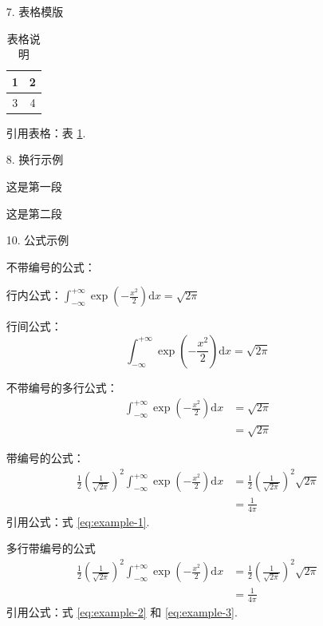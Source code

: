 \documentclass{ctexart}
\renewcommand{\d}{\mathrm{d}}
\begin{document}
\begin{enumerate}[wide, labelindent=0pt]
\item[7.] 表格模版
\begin{table}[H]
    \centering
    \begin{tabular}{|c|c|}
        \hline
        1 & 2 \\
        \hline
        3 & 4 \\
        \hline
    \end{tabular}
    \caption{表格说明}\label{tab:example}
\end{table}
引用表格：表 \ref{tab:example}. 

\item[8.] 换行示例

这是第一段

这是第二段

\item[10.] 公式示例

不带编号的公式：

行内公式：$\int_{-\infty}^{+\infty} \exp\left( -\frac{x^2}{2} \right) \d x = \sqrt{2\pi}$

行间公式：
\[
    \int_{-\infty}^{+\infty} \exp\left( -\frac{x^2}{2} \right) \d x = \sqrt{2\pi}
\]

不带编号的多行公式：
\begin{align*}
    \int_{-\infty}^{+\infty} \exp\left( -\frac{x^2}{2} \right) \d x
    &= \sqrt{2\pi} \\
    &= \sqrt{2\pi}
\end{align*}

带编号的公式：
\begin{equation}
    \begin{aligned}
        \frac{1}{2} \left( \frac{1}{\sqrt{2\pi}} \right)^2 \int_{-\infty}^{+\infty} \exp\left( -\frac{x^2}{2} \right) \d x
        &= \frac{1}{2} \left( \frac{1}{\sqrt{2\pi}} \right)^2 \sqrt{2\pi} \\
        &= \frac{1}{4\pi}
    \end{aligned}\label{eq:example-1}
\end{equation}
引用公式：式 \eqref{eq:example-1}. 

多行带编号的公式
\begin{align}
    \frac{1}{2} \left( \frac{1}{\sqrt{2\pi}} \right)^2 \int_{-\infty}^{+\infty} \exp\left( -\frac{x^2}{2} \right) \d x
    &= \frac{1}{2} \left( \frac{1}{\sqrt{2\pi}} \right)^2 \sqrt{2\pi} \label{eq:example-2} \\
        &= \frac{1}{4\pi} \label{eq:example-3}
\end{align}
引用公式：式 \eqref{eq:example-2} 和 \eqref{eq:example-3}. 


\end{enumerate}
\end{document}
